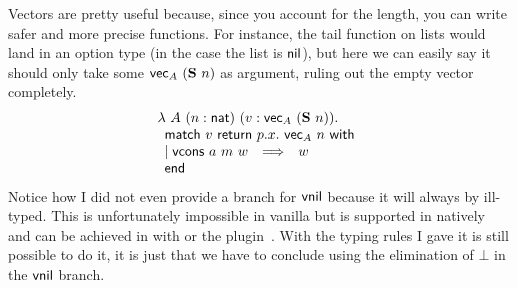 Vectors are pretty useful because, since you account for the length, you can
write safer and more precise functions. For instance, the tail function on lists
would land in an option type (in the case the list is \(\mathsf{nil}\)), but here we
can easily say it should only take some \(\tvec_A\ (\natsucc\ n)\) as argument,
ruling out the empty vector completely.
\[
  \begin{array}{l}
    \lambda\ A\ (n : \nat)\ (v : \tvec_A\ (\natsucc\ n)). \\
    \pmatch{v}{p.x.\ \tvec_A\ n}{
      \branch{\vcons\ a\ m\ w}{w}
    }
  \end{array}
\]
Notice how I did not even provide a branch for \(\mathsf{vnil}\) because it will always
by ill-typed.%
%
This is unfortunately impossible in vanilla \Coq but is supported
in \Agda natively and can be achieved in \Coq with \Program or the \Equations
plugin~.
With the typing rules I gave it is still possible to do it, it is just that we
have to conclude using the elimination of \(\bot\) in the \(\mathsf{vnil}\) branch.

